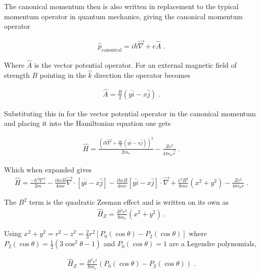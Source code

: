         The canonical momentum then is also written in replacement to the typical momentum operator in quantum mechanics, giving the canonical momentum operator 

        \begin{align}
            \hat{p}_{\text{canonical}} = i \hbar \vec{\nabla} + e \hat{A} \;.
        \end{align}

        \noindent Where $\hat{A}$ is the vector potential operator. For an external magnetic field of strength $B$ pointing in the $\hat{k}$ direction the operator becomes 

        \begin{align}
            \hat{A} = \frac{B}{2} \left(y \hat{i} - x \hat{j} \right)\;.
        \end{align}

        \noindent Substituting this in for the vector potential operator in the canonical momentum and placing it into the Hamiltonian equation one gets 

        \begin{align}
            \hat{H} = \frac{\left(i\hbar \vec{\nabla} + \frac{Be}{2}\left(y \hat{i} - x \hat{j} \right)\right)^2}{2m_e} - \frac{Ze^2}{4 \pi \epsilon_0 \vec{r}}\;.
        \end{align}

        \noindent Which when expanded gives
        \small
        \begin{align}
            \hat{H} = \frac{-\hbar^2 \nabla^2}{2m} - \frac{i\hbar e B}{4mc} \vec{\nabla} \cdot \left[y\hat{i} - x\hat{j} \right] - \frac{i\hbar e B}{4mc} \left[y\hat{i} - x\hat{j} \right] \cdot \vec{\nabla} + \frac{e^2B^2}{8mc} \left(x^2 + y^2\right) - \frac{Ze^2}{4\pi \epsilon_0 r}\;.
        \end{align}
        \normalsize

        \noindent The $B^2$ term is the quadratic Zeeman effect and is written on its own as
        \begin{align}
            \hat{H}_Z = \frac{B^2e^2}{8m_e} (x^2 + y^2)\;.
        \end{align}

        \noindent Using $x^2 + y^2 = r^2 - z^2 = \frac{2}{3}r^2\left[ P_0(\cos \theta) - P_2(\cos \theta)\right]$ where $P_2(\cos \theta) = \frac{1}{2}\left(3\cos^2\theta - 1\right)$ and $P_0(\cos \theta) = 1$ are a Legendre polynomials,

        \begin{align}
            \hat{H}_Z = \frac{B^2e^2}{8m_e} (P_0(\cos \theta) - P_2(\cos \theta))\;.
        \end{align}

